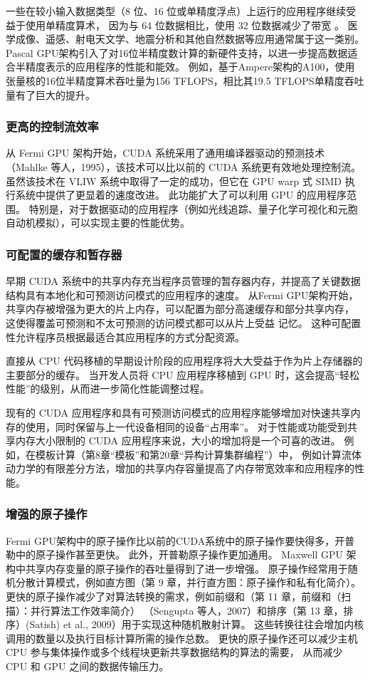 一些在较小输入数据类型（8 位、16 位或单精度浮点）上运行的应用程序继续受益于使用单精度算术，
因为与 64 位数据相比，使用 32 位数据减少了带宽 。 
医学成像、遥感、射电天文学、地震分析和其他自然数据等应用通常属于这一类别。 
Pascal GPU架构引入了对16位半精度数计算的新硬件支持，以进一步提高数据适合半精度表示的应用程序的性能和能效。 
例如，基于Ampere架构的A100，使用张量核的16位半精度算术吞吐量为156 TFLOPS，相比其19.5 TFLOPS单精度吞吐量有了巨大的提升。

\subsubsection{更高的控制流效率}
从 Fermi GPU 架构开始，CUDA 系统采用了通用编译器驱动的预测技术（Mahlke 等人，1995），该技术可以比以前的 CUDA 系统更有效地处理控制流。 虽然该技术在 VLIW 系统中取得了一定的成功，但它在 GPU warp 式 SIMD 执行系统中提供了更显着的速度改进。 此功能扩大了可以利用 GPU 的应用程序范围。 特别是，对于数据驱动的应用程序（例如光线追踪、量子化学可视化和元胞自动机模拟），可以实现主要的性能优势。

\subsubsection{可配置的缓存和暂存器}
早期 CUDA 系统中的共享内存充当程序员管理的暂存器内存，并提高了关键数据结构具有本地化和可预测访问模式的应用程序的速度。 
从Fermi GPU架构开始，共享内存被增强为更大的片上内存，可以配置为部分高速缓存和部分共享内存，
这使得覆盖可预测和不太可预测的访问模式都可以从片上受益 记忆。 这种可配置性允许程序员根据最适合其应用程序的方式分配资源。

直接从 CPU 代码移植的早期设计阶段的应用程序将大大受益于作为片上存储器的主要部分的缓存。 
当开发人员将 CPU 应用程序移植到 GPU 时，这会提高“轻松性能”的级别，从而进一步简化性能调整过程。

现有的 CUDA 应用程序和具有可预测访问模式的应用程序能够增加对快速共享内存的使用，同时保留与上一代设备相同的设备“占用率”。 
对于性能或功能受到共享内存大小限制的 CUDA 应用程序来说，大小的增加将是一个可喜的改进。 
例如，在模板计算（第8章“模板”和第20章“异构计算集群编程”）中，
例如计算流体动力学的有限差分方法，增加的共享内存容量提高了内存带宽效率和应用程序的性能。

\subsubsection{增强的原子操作}
Fermi GPU架构中的原子操作比以前的CUDA系统中的原子操作要快得多，开普勒中的原子操作甚至更快。 
此外，开普勒原子操作更加通用。 Maxwell GPU 架构中共享内存变量的原子操作的吞吐量得到了进一步增强。 
原子操作经常用于随机分散计算模式，例如直方图（第 9 章，并行直方图：原子操作和私有化简介）。 
更快的原子操作减少了对算法转换的需求，例如前缀和（第 11 章，前缀和（扫描）：并行算法工作效率简介）
（Sengupta 等人，2007）和排序（第 13 章，排序）(Satish) et al., 2009）用于实现这种随机散射计算。 
这些转换往往会增加内核调用的数量以及执行目标计算所需的操作总数。 
更快的原子操作还可以减少主机 CPU 参与集体操作或多个线程块更新共享数据结构的算法的需要，
从而减少 CPU 和 GPU 之间的数据传输压力。

